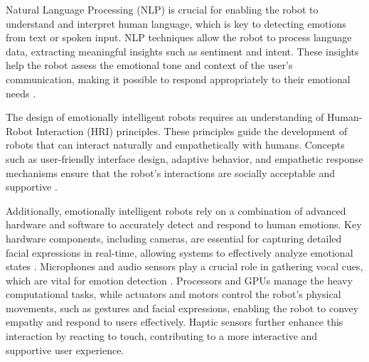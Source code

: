 Natural Language Processing (NLP) is crucial for enabling the robot to understand and interpret human language, which is key to detecting emotions from text or spoken input. NLP techniques allow the robot to process language data, extracting meaningful insights such as sentiment and intent. These insights help the robot assess the emotional tone and context of the user's communication, making it possible to respond appropriately to their emotional needs \cite{khurana2017}.

The design of emotionally intelligent robots requires an understanding of Human-Robot Interaction (HRI) principles. These principles guide the development of robots that can interact naturally and empathetically with humans. Concepts such as user-friendly interface design, adaptive behavior, and empathetic response mechanisms ensure that the robot's interactions are socially acceptable and supportive \cite{bartneck2024}.

Additionally, emotionally intelligent robots rely on a combination of advanced hardware and software to accurately detect and respond to human emotions. Key hardware components, including cameras, are essential for capturing detailed facial expressions in real-time, allowing systems to effectively analyze emotional states \cite{gupta2024}. Microphones and audio sensors play a crucial role in gathering vocal cues, which are vital for emotion detection \cite{rastogi2023}. Processors and GPUs manage the heavy computational tasks, while actuators and motors control the robot's physical movements, such as gestures and facial expressions, enabling the robot to convey empathy and respond to users effectively. Haptic sensors further enhance this interaction by reacting to touch, contributing to a more interactive and supportive user experience.